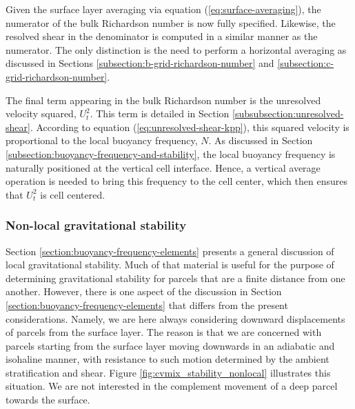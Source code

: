 Given the surface layer averaging via equation
(\ref{eq:surface-averaging}), the numerator of the bulk Richardson
number is now fully specified.  Likewise, the resolved shear in the
denominator is computed in a similar manner as the numerator.  The
only distinction is the need to perform a horizontal averaging as
discussed in Sections \ref{subsection:b-grid-richardson-number} and
\ref{subsection:c-grid-richardson-number}.

The final term appearing in the bulk Richardson number is the
unresolved velocity squared, $U_{t}^{2}$.  This term is detailed in
Section \ref{subsubsection:unresolved-shear}. According to equation
(\ref{eq:unresolved-shear-kpp}), this squared velocity is proportional
to the local buoyancy frequency, $N$.  As discussed in Section
\ref{subsection:buoyancy-frequency-and-stability}, the local buoyancy
frequency is naturally positioned at the vertical cell interface.
Hence, a vertical average operation is needed to bring this frequency
to the cell center, which then ensures that  $U_{t}^{2}$ is cell centered. 


\subsubsection{Non-local gravitational stability}

Section \ref{section:buoyancy-frequency-elements} presents a general
discussion of local gravitational stability.  Much of that material is
useful for the purpose of determining gravitational stability for
parcels that are a finite distance from one another.  However, there
is one aspect of the discussion in Section
\ref{section:buoyancy-frequency-elements} that differs from the
present considerations.  Namely, we are here always considering
downward displacements of parcels from the surface layer.  The reason
is that we are concerned with parcels starting from the surface layer
moving downwards in an adiabatic and isohaline manner, with resistance
to such motion determined by the ambient stratification and shear.
Figure \ref{fig:cvmix_stability_nonlocal} illustrates this situation.
We are not interested in the complement movement of a deep parcel
towards the surface.


